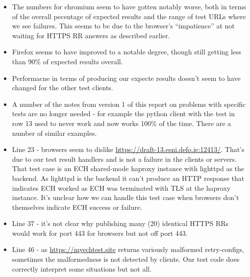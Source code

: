\begin{itemize}

    \item The numbers for chromium seem to have gotten notably worse, both in
        terms of the overall pecentage of expected results and the range of
        test URLs where we see failures. This seems to be due to the browser's
        ``impatience'' at not waiting for HTTPS RR answers as described earlier.

   \item Firefox seems to have improved to a notable degree, though still getting
       less than 90\% of expected results overall.

   \item Performacne in terms of producing our expecte results doesn't seem to
       have changed for the other test clients.

   \item A number of the notes from version 1 of this report on problems with
       specific tests are no longer needed - for example the python client with
       the test in row 13 used to never work and now works 100\% of the time.
       There are a number of similar examples.

    \item Line 23 - browsers seem to dislike
        \url{https://draft-13.esni.defo.ie:12413/}.  That's due to our test
        result handlers and is not a failure in the clients or servers. That test case is
        an ECH shared-mode haproxy instance with lighttpd as the backend. As
        lighttpd is the backend it can't produce an HTTP response that
        indicates ECH worked as ECH was terminated with TLS at the haproxy
        instance. It's unclear how we can handle this test case when browsers
        don't themselves indicate ECH success or failure.

    \item Line 37 - it's not clear why publishing many (20) identical HTTPS RRs
        would work for port 443 for browsers but not off port 443.

    \item Line 46 - as \url{https://myechtest.site} returns variously malformed
        retry-configs, sometimes the malformedness is not detected by clients.
        Our test code does correctly interpret some situations but not all.


\end{itemize}
